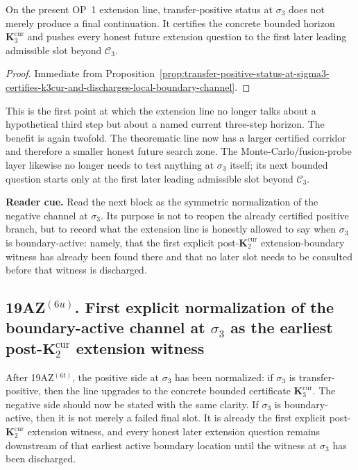 \begin{corollary}
\label{cor:positive-channel-at-sigma3-upgrades-certified-horizon-from-k2cur-to-k3cur}
On the present OP~1 extension line, transfer-positive status at $\sigma_3$ does not merely produce a final continuation. It certifies the concrete bounded horizon $\mathbf K_3^{\mathrm{cur}}$ and pushes every honest future extension question to the first later leading admissible slot beyond $\mathcal C_3$.
\end{corollary}

\begin{proof}
Immediate from Proposition~\ref{prop:transfer-positive-status-at-sigma3-certifies-k3cur-and-discharges-local-boundary-channel}.
\end{proof}

\begin{remark}
\label{rem:what-certifying-k3cur-now-buys}
This is the first point at which the extension line no longer talks about a hypothetical third step but about a named current three-step horizon. The benefit is again twofold. The theorematic line now has a larger certified corridor and therefore a smaller honest future search zone. The Monte-Carlo/fusion-probe layer likewise no longer needs to test anything at $\sigma_3$ itself; its next bounded question starts only at the first later leading admissible slot beyond $\mathcal C_3$.
\end{remark}


\noindent\textbf{Reader cue.} Read the next block as the symmetric normalization of the negative channel at $\sigma_3$. Its purpose is not to reopen the already certified positive branch, but to record what the extension line is honestly allowed to say when $\sigma_3$ is boundary-active: namely, that the first explicit post-$\mathbf K_2^{\mathrm{cur}}$ extension-boundary witness has already been found there and that no later slot needs to be consulted before that witness is discharged.

\subsection*{19AZ$^{(6u)}$. First explicit normalization of the boundary-active channel at $\sigma_3$ as the earliest post-$\mathbf K_2^{\mathrm{cur}}$ extension witness}
\label{sec:first-explicit-normalization-of-boundary-active-channel-at-sigma3-as-earliest-post-k2cur-extension-witness}
After 19AZ$^{(6t)}$, the positive side at $\sigma_3$ has been normalized: if $\sigma_3$ is transfer-positive, then the line upgrades to the concrete bounded certificate $\mathbf K_3^{\mathrm{cur}}$. The negative side should now be stated with the same clarity. If $\sigma_3$ is boundary-active, then it is not merely a failed final slot. It is already the first explicit post-$\mathbf K_2^{\mathrm{cur}}$ extension witness, and every honest later extension question remains downstream of that earliest active boundary location until the witness at $\sigma_3$ has been discharged.

